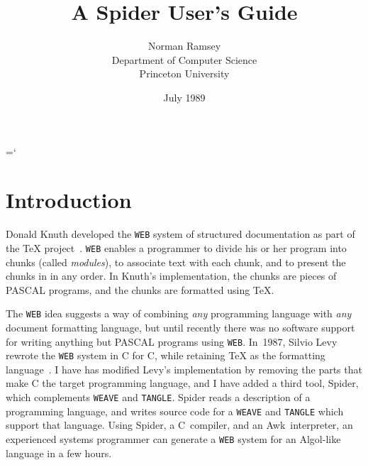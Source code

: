 

\setcounter{secnumdepth}{0}
\newcommand{\syntax}[1]{\mbox{$\langle\hbox{\sl #1\/}\rangle$}}
\newcommand{\produces}{\mbox{${}::={}$}}
\newcommand{\opt}[1]{$[$#1$]$}
\newcommand{\BS}{\relax}
\chardef\BS=`\\ %

\title{A {Spider} User's Guide}
\author{Norman Ramsey\\Department of Computer Science\\Princeton University}
\date{July 1989}
\newcommand {\WEB}{{\tt WEB}}


\maketitle

\section{Introduction}
Donald Knuth developed the {\tt WEB} system of structured documentation 
as part of the {\TeX} project~\cite{knuth:literate-programming}.
{\WEB} enables a programmer to divide his or her program into chunks (called
{\em modules}), to associate text with each chunk, and to present the
chunks in in any order.
In Knuth's implementation, the chunks are pieces of PASCAL programs,
and the chunks are formatted using {\TeX}.

  The {\tt WEB} idea suggests a way of combining {\em any}
programming language with {\em any} document formatting language,
but until recently there was no software support for writing anything
but PASCAL programs using {\tt WEB}.
In~1987, Silvio Levy rewrote the {\tt WEB} system in C for C,
while retaining {\TeX} as the formatting language~\cite{levy:cweb}.
I have has modified Levy's implementation by removing the parts
that  make C the target programming language, and I have
 added a third tool, {Spider}, which complements {\tt WEAVE}
and {\tt TANGLE}.
{Spider} reads a description of a programming language, and writes
source code for a {\tt WEAVE} and {\tt TANGLE} which support that
language. 
Using {Spider}, a C~compiler, and an Awk~interpreter, an experienced
systems programmer can generate  a {\tt WEB} system for
an Algol-like language in a few hours.

